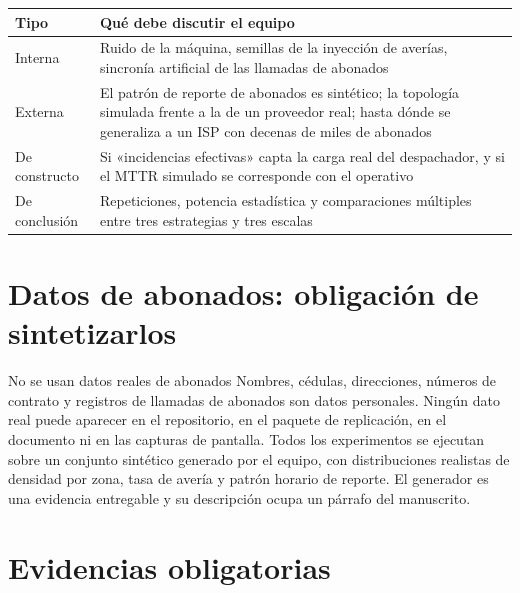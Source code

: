 \documentclass[11pt,a4paper]{article}
\begin{document}
\begin{center}
	\small
	\begin{tabular}{@{}p{3.2cm}p{11.8cm}@{}}
		\toprule
		\textbf{Tipo} & \textbf{Qué debe discutir el equipo} \\
		\midrule
		Interna & Ruido de la máquina, semillas de la inyección de averías, sincronía artificial de las llamadas de abonados \\
		\addlinespace
		Externa & El patrón de reporte de abonados es sintético; la topología simulada frente a la de un proveedor real; hasta dónde se generaliza a un ISP con decenas de miles de abonados \\
		\addlinespace
		De constructo & Si «incidencias efectivas» capta la carga real del despachador, y si el MTTR simulado se corresponde con el operativo \\
		\addlinespace
		De conclusión & Repeticiones, potencia estadística y comparaciones múltiples entre tres estrategias y tres escalas \\
		\bottomrule
	\end{tabular}
\end{center}

\section{Datos de abonados: obligación de sintetizarlos}

\begin{alerta}{No se usan datos reales de abonados}
	Nombres, cédulas, direcciones, números de contrato y registros de llamadas de abonados son datos personales. Ningún dato real puede aparecer en el repositorio, en el paquete de replicación, en el documento ni en las capturas de pantalla. Todos los experimentos se ejecutan sobre un conjunto sintético generado por el equipo, con distribuciones realistas de densidad por zona, tasa de avería y patrón horario de reporte. El generador es una evidencia entregable y su descripción ocupa un párrafo del manuscrito.
\end{alerta}

\section{Evidencias obligatorias}
\end{document}
